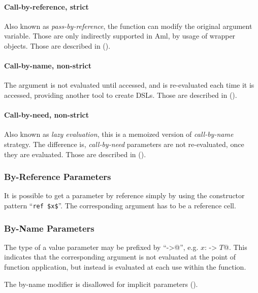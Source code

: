 \paragraph{Call-by-reference, strict}
Also known as {\em pass-by-reference}, the function can modify the original argument variable. Those are only indirectly supported in Aml, by usage of wrapper objects. Those are described in ().

\paragraph{Call-by-name, non-strict}
The argument is not evaluated until accessed, and is re-evaluated each time it is accessed, providing another tool to create DSLs. Those are described in (). 

\paragraph{Call-by-need, non-strict}
Also known as {\em lazy evaluation}, this is a memoized version of {\em call-by-name} strategy. The difference is, {\em call-by-need} parameters are not re-evaluated, once they are evaluated. Those are described in ().





\subsubsection{By-Reference Parameters}
\label{sec:by-ref-parameters}

It is possible to get a parameter by reference simply by using the constructor pattern ``\lstinline!ref $x$!''. The corresponding argument has to be a reference cell. 





\subsubsection{By-Name Parameters}
\label{sec:by-name-parameters}

The type of a value parameter may be prefixed by ``\lstinline@->@'', e.g. \lstinline@$x$: -> $T$@. This indicates that the corresponding argument is not evaluated at the point of function application, but instead is evaluated at each use within the function.

The by-name modifier is disallowed for implicit parameters ().

